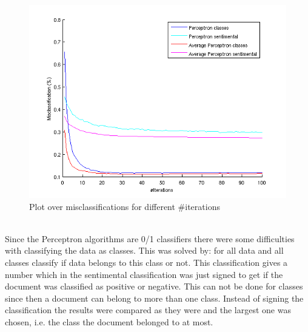 \begin{figure}[h!]
\centering
\includegraphics[scale = 0.5]{../Plottar/perceptron_2000words_unigram_10foldcv_classes-high_sentimental-low.png}
\caption{Plot over misclassifications for different \#iterations}
\label{fig:number_iterations}
\end{figure}\\
Since the Perceptron algorithms are 0/1 classifiers there were some difficulties with classifying the data as classes. This was solved by: for all data and all classes classify if data belongs to this class or not. This classification gives a number which in the sentimental classification was just signed to get if the document was classified as positive or negative. This can not be done for classes since then a document can belong to more than one class. Instead of signing the classification the results were compared as they were and the largest one was chosen, i.e. the class the document belonged to at most. 
